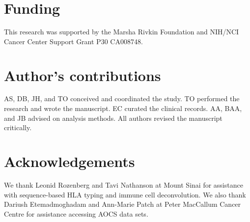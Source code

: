 \documentclass[linenumbers]{bmcart}
\begin{document}
\begin{backmatter}
\section*{Funding}
This research was supported by the Marsha Rivkin Foundation and NIH/NCI Cancer Center Support Grant P30 CA008748.

\section*{Author's contributions}
 AS, DB, JH, and TO conceived and coordinated the study. TO performed the research and wrote the manuscript. EC curated the clinical records. AA, BAA, and JB advised on analysis methods.  All authors revised the manuscript critically.

\section*{Acknowledgements}
We thank Leonid Rozenberg and Tavi Nathanson at Mount Sinai for assistance with sequence-based HLA typing and immune cell deconvolution. We also thank Dariush Etemadmoghadam and Ann-Marie Patch at Peter MacCallum Cancer Centre for assistance accessing AOCS data sets.




\end{backmatter}
\end{document}
